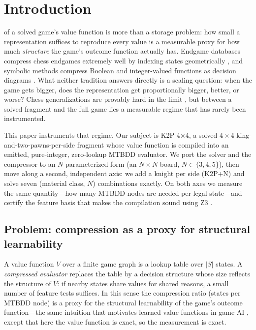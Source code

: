 \documentclass[conference]{IEEEtran}
\begin{document}
\section{Introduction}
 of a solved game's value function is more than
a storage problem: how small a representation suffices to reproduce every
value is a measurable proxy for how much \emph{structure} the game's outcome
function actually has. Endgame databases compress chess endgames extremely
well by indexing states geometrically \cite{thompson1986,nalimov2000}, and
symbolic methods compress Boolean and integer-valued functions as decision
diagrams \cite{bryant1986,bryant1992,bahar1997,fujita1997}. What neither
tradition answers directly is a scaling question: when the game gets bigger,
does the representation get proportionally bigger, better, or worse? Chess
generalizations are provably hard in the limit \cite{fraenkel1983,robson1984},
but between a solved fragment and the full game lies a measurable regime that
has rarely been instrumented.

This paper instruments that regime. Our subject is K2P-4$\times$4, a solved
$4\times4$ king-and-two-pawns-per-side fragment \cite{k2p2025} whose value
function is compiled into an emitted, pure-integer, zero-lookup MTBDD
evaluator. We port the solver and the compressor to an $N$-parameterized
form (an $N\times N$ board, $N\in\{3,4,5\}$), then move along a second,
independent axis: we add a knight per side (K2P+N) and solve seven
(material class, $N$) combinations exactly. On both axes we measure the same
quantity---how many MTBDD nodes are needed per legal state---and certify the
feature basis that makes the compilation sound using Z3 \cite{demoura2008}.

\subsection{Problem: compression as a proxy for structural learnability}
A value function $V$ over a finite game graph is a lookup table over
$|S|$ states. A \emph{compressed evaluator} replaces the table by a decision
structure whose size reflects the structure of $V$: if nearby states share
values for shared reasons, a small number of feature tests suffices. In this
sense the compression ratio (states per MTBDD node) is a proxy for the
structural learnability of the game's outcome function---the same intuition
that motivates learned value functions in game AI
\cite{silver2017,silver2018,schrittwieser2020}, except that here the value
function is exact, so the measurement is exact.
\end{document}
